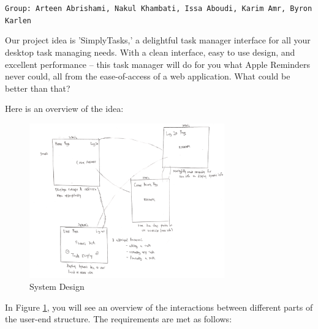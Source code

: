 \documentclass[10pt, letterpaper]{article}
\let\tab\quad
\begin{document}
\texttt{Group: Arteen Abrishami, Nakul Khambati, Issa Aboudi, Karim Amr, Byron Karlen}

\tab Our project idea is 'SimplyTasks,' a delightful task manager interface for all your desktop task managing needs. With a clean interface, easy to use design, and excellent performance -- this task manager will do for you what Apple Reminders never could, all from the ease-of-access of a web application. What could be better than that?

\tab Here is an overview of the idea: 

\begin{figure}[h!]
	\begin{center}
		\includegraphics[width=0.75\textwidth]{illustration.png}
	\caption{System Design}
	\label{fig:design}
	\end{center}
\end{figure}

\tab In Figure \ref{fig:design}, you will see an overview of the interactions between different parts of the user-end structure. The requirements are met as follows:
\end{document}
